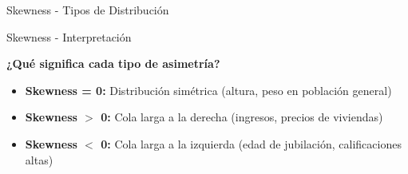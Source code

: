 \documentclass{beamer}
\begin{document}
\begin{frame}{Skewness - Tipos de Distribución}
    
    \begin{center}
        \hspace{-1cm}
    \end{center}
\end{frame}

\begin{frame}{Skewness - Interpretación}
    \begin{center}
        \textbf{¿Qué significa cada tipo de asimetría?}
    \end{center}
    
    \vspace{0.5cm}
    
    \begin{itemize}
        \item<1->[{\makebox[1em][c]{\textcolor{black}{\faBalanceScale}}}] \textbf{Skewness = 0:} Distribución simétrica (altura, peso en población general)
        \item<2->[{\makebox[1em][c]{\textcolor{black}{\faArrowRight}}}] \textbf{Skewness $>$ 0:} Cola larga a la derecha (ingresos, precios de viviendas)
        \item<3->[{\makebox[1em][c]{\textcolor{black}{\faArrowLeft}}}] \textbf{Skewness $<$ 0:} Cola larga a la izquierda (edad de jubilación, calificaciones altas)
    \end{itemize}
    
\end{frame}
\end{document}
